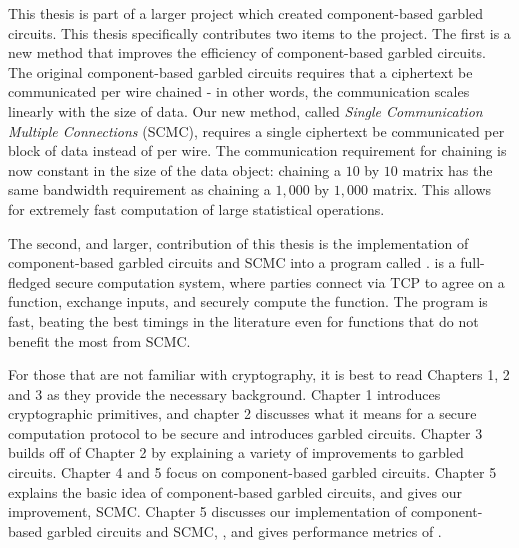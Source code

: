 This thesis is part of a larger project which created component-based garbled circuits.
This thesis specifically contributes two items to the project.
The first is a new method that improves the efficiency of component-based garbled circuits. 
The original component-based garbled circuits requires that a ciphertext be communicated per wire chained - in other words, the communication scales linearly with the size of data.
Our new method, called \textit{Single Communication Multiple Connections} (SCMC), requires a single ciphertext be communicated per block of data instead of per wire. 
The communication requirement for chaining is now constant in the size of the data object: chaining a $10$ by $10$ matrix has the same bandwidth requirement as chaining a $1,000$ by $1,000$ matrix. 
This allows for extremely fast computation of large statistical operations. 

The second, and larger, contribution of this thesis is the implementation of component-based garbled circuits and SCMC into a program called \CompGC. 
\CompGC is a full-fledged secure computation system, where parties connect via TCP to agree on a function, exchange inputs, and securely compute the function.
The program is fast, beating the best timings in the literature even for functions that do not benefit the most from SCMC.

For those that are not familiar with cryptography, it is best to read Chapters 1, 2 and 3 as they provide the necessary background.
Chapter 1 introduces cryptographic primitives, and chapter 2 discusses what it means for a secure computation protocol to be secure and introduces garbled circuits.
Chapter 3 builds off of Chapter 2 by explaining a variety of improvements to garbled circuits.
Chapter 4 and 5 focus on component-based garbled circuits.
Chapter 5 explains the basic idea of component-based garbled circuits, and gives our improvement, SCMC.
Chapter 5 discusses our implementation of component-based garbled circuits and SCMC, \CompGC, and gives performance metrics of \CompGC.







